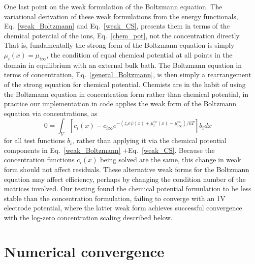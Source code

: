 One last point on the weak formulation of the Boltzmann equation. The variational
derivation of these weak formulations from the energy functionals,
Eq.~\eqref{weak_Boltzmann} and Eq.~\eqref{weak_CS}, presents them in terms of the
chemical potential of the ions, Eq.~\eqref{chem_pot}, not the concentration directly. That
is, fundamentally the strong form of the Boltzmann equation is simply $\mu_i(x) =
\mu_{i\infty}$, the condition of equal chemical potential at all
points in the domain in equilibrium with an external bulk bath.
The Boltzmann
equation in terms of 
concentration, Eq.~\eqref{general_Boltzmann}, is then simply a rearrangement of
the strong equation for chemical potential. Chemists are in the
habit of using the Boltzmann equation in concentration form rather
than chemical potential, in practice our implementation in code applies the weak
form of the Boltzmann equation via concentrations, as
\begin{equation}
0 =   \int_V \left[ c_i(x) - c_{i\infty}
    e^{-\left(z_i e \psi(x) +
      \mu_i^{ex}(x)-\mu_{i\infty}^{ex}\right)/kT} \right] b_i
dx 
\label{weak_Boltzmann_conc}
\end{equation}
for all test functions $b_i$, rather than applying it via the chemical
potential components in Eq.~\eqref{weak_Boltzmann}
+Eq.~\eqref{weak_CS}. Because the concentration functions $c_i(x)$ being
solved are the same, this change in weak form should not affect
residuals.  These alternative weak forms for the Boltzmann
equation may affect efficiency, perhaps by changing the condition number
of the matrices involved. Our
testing found the chemical potential formulation to be less stable than the
concentration formulation, failing to converge with an 1V electrode
potential, where the latter weak form achieves successful convergence
with the log-zero concentration scaling described below.

\section{Numerical convergence}

